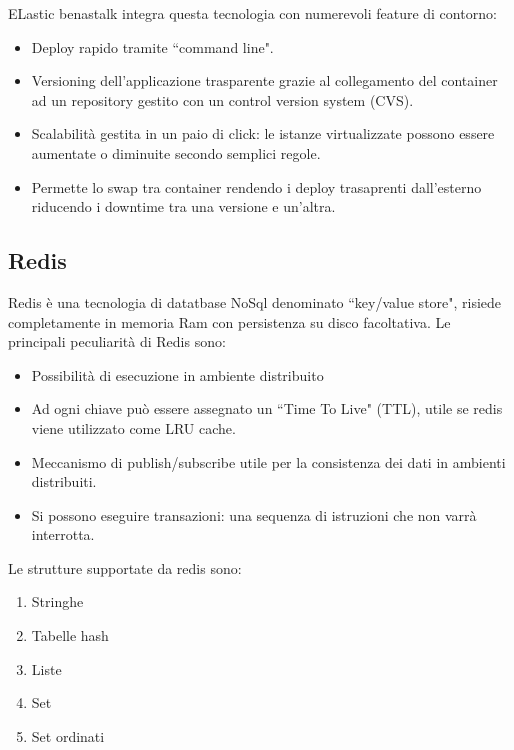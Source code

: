 ELastic benastalk integra questa tecnologia con numerevoli feature di contorno: 
\begin{itemize}
	\item Deploy rapido tramite ``command line".
	\item Versioning dell'applicazione trasparente grazie al collegamento del container ad un repository gestito con un control version system (CVS).
	\item Scalabilità gestita in un paio di click: le istanze virtualizzate possono essere aumentate o diminuite secondo semplici regole.
	\item Permette lo swap tra container rendendo i deploy trasaprenti dall'esterno riducendo i downtime tra una versione e un'altra.
\end{itemize}

\subsection{Redis}
Redis è una tecnologia di datatbase NoSql denominato ``key/value store", risiede completamente in memoria Ram con persistenza su disco facoltativa. Le principali peculiarità di Redis sono:
\begin{itemize}
	\item Possibilità di esecuzione in ambiente distribuito
	\item Ad ogni chiave può essere assegnato un ``Time To Live" (TTL), utile se redis viene utilizzato come LRU cache.
	\item Meccanismo di publish/subscribe utile per la consistenza dei dati in ambienti distribuiti.
	\item Si possono eseguire transazioni: una sequenza di istruzioni che non varrà interrotta.
\end{itemize}
Le strutture supportate da redis sono:
\begin{enumerate}
	\item Stringhe
	\item Tabelle hash
	\item Liste
	\item Set
	\item Set ordinati
\end{enumerate}

